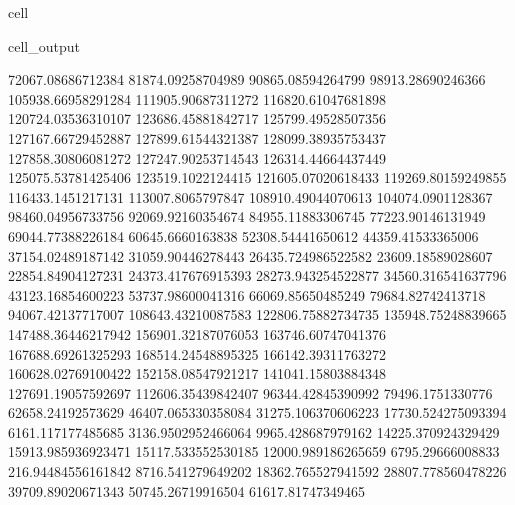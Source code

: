 \documentclass[letterpaper,10pt,english]{jupyterBook}
\begin{document}
\begin{sphinxuseclass}{cell}
\begin{sphinxVerbatimOutput}
\begin{sphinxuseclass}{cell_output}
\begin{sphinxVerbatim}[commandchars=\\\{\}]
72067.08686712384  81874.09258704989  90865.08594264799  98913.28690246366  105938.66958291284  111905.90687311272  116820.61047681898  120724.03536310107  123686.45881842717  125799.49528507356  127167.66729452887  127899.61544321387  128099.38935753437  127858.30806081272  127247.90253714543  126314.44664437449  125075.53781425406  123519.1022124415  121605.07020618433  119269.80159249855  116433.1451217131  113007.8065797847  108910.49044070613  104074.0901128367  98460.04956733756  92069.92160354674  84955.11883306745  77223.90146131949  69044.77388226184  60645.6660163838  52308.54441650612  44359.41533365006  37154.02489187142  31059.90446278443  26435.724986522582  23609.18589028607  22854.84904127231  24373.417676915393  28273.943254522877  34560.316541637796  43123.16854600223  53737.98600041316  66069.85650485249  79684.82742413718  94067.42137717007  108643.43210087583  122806.75882734735  135948.75248839665  147488.36446217942  156901.32187076053  163746.60747041376  167688.69261325293  168514.24548895325  166142.39311763272  160628.02769100422  152158.08547921217  141041.15803884348  127691.19057592697  112606.35439842407  96344.42845390992  79496.1751330776  62658.24192573629  46407.065330358084  31275.106370606223  17730.524275093394  6161.117177485685  \PYGZhy{}3136.9502952466064  \PYGZhy{}9965.428687979162  \PYGZhy{}14225.370924329429  \PYGZhy{}15913.985936923471  \PYGZhy{}15117.533552530185  \PYGZhy{}12000.989186265659  \PYGZhy{}6795.29666008833  216.94484556161842  8716.541279649202  18362.765527941592  28807.778560478226  39709.89020671343  50745.26719916504  61617.81747349465  

\end{sphinxVerbatim}
\end{sphinxuseclass}
\end{sphinxVerbatimOutput}
\end{sphinxuseclass}
\end{document}
